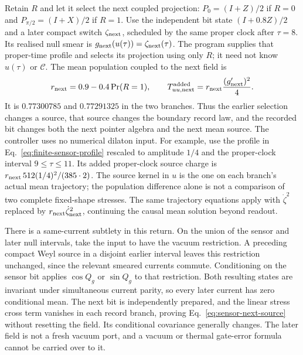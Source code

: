 \documentclass[12pt,a4paper]{article}
\begin{document}
Retain $R$ and let it select the next coupled projection:
$P_0=(I+Z)/2$ if $R=0$ and $P_{\pi/2}=(I+X)/2$ if $R=1$.
Use the independent bit state $(I+0.8Z)/2$ and a later compact switch
$\zeta_{\rm next}$, scheduled by the same proper clock after $\tau=8$.
Its realised null smear is $g_{\rm next}(u(\tau))=\zeta_{\rm next}(\tau)$.
The program supplies that proper-time profile and selects its projection using
only $R$; it need not know $u(\tau)$ or $\mathcal C$.
The mean population coupled to the next field is
\begin{equation}\label{eq:sensor-next-source}
 r_{\rm next}=0.9-0.4\Pr(R=1),\qquad
 T_{uu,\rm next}^{\rm added}
       =r_{\rm next}\frac{(g_{\rm next}')^2}{4}.
\end{equation}
It is $0.77300785$ and $0.77291325$ in the two branches. Thus the earlier
selection changes a source, that source changes the boundary record law, and
the recorded bit changes both the next pointer algebra and the next mean source.
The controller uses no numerical dilaton input.
For example, use the profile in Eq.~\eqref{eq:finite-sensor-profile} rescaled
to amplitude $1/4$ and the proper-clock interval $9\le\tau\le11$.
Its added proper-clock source charge is
$r_{\rm next}\,512(1/4)^2/(385\cdot2)$. The source kernel in $u$ is the one
on each branch's actual mean trajectory; the population difference alone is
not a comparison of two complete fixed-shape stresses. The same trajectory
equations apply with $\dot\zeta^2$ replaced by
$r_{\rm next}\dot\zeta_{\rm next}^2$, continuing the causal mean solution
beyond readout.

There is a same-current subtlety in this return. On the union of the sensor and
later null intervals, take the input to have the vacuum restriction. A preceding
compact Weyl source in a disjoint earlier interval leaves this restriction
unchanged, since the relevant smeared currents commute. Conditioning on the
sensor bit applies $\cos Q_g$ or $\sin Q_g$ to that restriction. Both resulting
states are invariant under simultaneous current parity, so every later current
has zero conditional mean. The next bit is independently prepared, and the
linear stress cross term vanishes in each record branch, proving
Eq.~\eqref{eq:sensor-next-source} without resetting the field. Its conditional
covariance generally changes. The later field is not a fresh vacuum port, and
a vacuum or thermal gate-error formula cannot be carried over to it.
\end{document}
